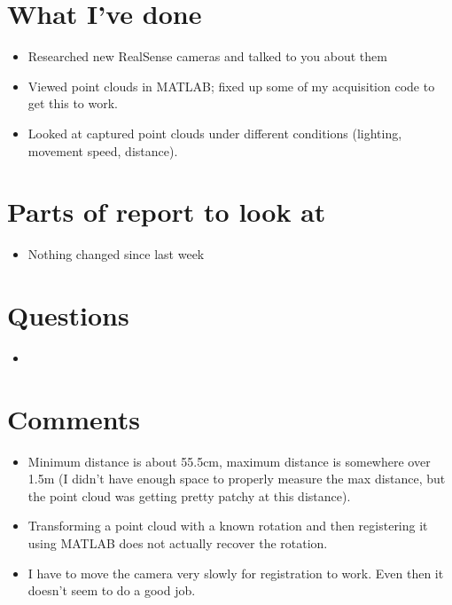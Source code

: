 \documentclass[12pt,a4paper]{article}
\begin{document}
\author{Katrina Ashton}


\pagestyle{fancy}
\fancyhf{}
\rhead{\thepage}

\section{What I've done}
\begin{itemize}
\item{Researched new RealSense cameras and talked to you about them}
\item{Viewed point clouds in MATLAB; fixed up some of my acquisition code to get this to work.}
\item{Looked at captured point clouds under different conditions (lighting, movement speed, distance).}
\end{itemize}

\section{Parts of report to look at}
\begin{itemize}
\item{Nothing changed since last week}
\end{itemize}

\section{Questions}
\begin{itemize}
\item{}
\end{itemize}

\section{Comments}
\begin{itemize}
\item{Minimum distance is about 55.5cm, maximum distance is somewhere over 1.5m (I didn't have enough space to properly measure the max distance, but the point cloud was getting pretty patchy at this distance).}
\item{Transforming a point cloud with a known rotation and then registering it using MATLAB does not actually recover the rotation.}
\item{I have to move the camera very slowly for registration to work. Even then it doesn't seem to do a good job.}
\end{itemize}
\end{document}

